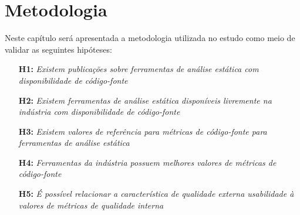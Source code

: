 \documentclass[qual, classic, a4paper]{ufbathesis}
\begin{document}
\chapter{Metodologia}

%
%

Neste capítulo será apresentada a metodologia utilizada no estudo como meio
de validar as seguintes hipóteses:

\begin{enumerate}
  \item[{\bf H1:}] {\em Existem publicações sobre ferramentas de análise
    estática com disponibilidade de código-fonte}
  \item[{\bf H2:}] {\em Existem ferramentas de análise estática disponíveis
    livremente na indústria com disponibilidade de código-fonte}
  \item[{\bf H3:}] {\em Existem valores de referência para métricas de
    código-fonte para ferramentas de análise estática}
  \item[{\bf H4:}] {\em Ferramentas da indústria possuem melhores valores de
    métricas de código-fonte}
  \item[{\bf H5:}] {\em É possível relacionar a característica de qualidade
    externa usabilidade à valores de métricas de qualidade interna}
\end{enumerate}

%  
\end{document}
